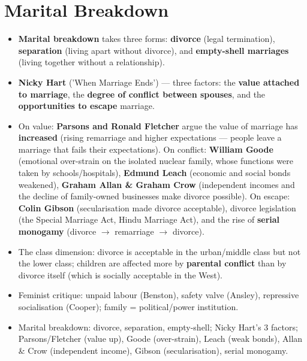 \section{Marital Breakdown}

\begin{KeyConcept}
\begin{itemize}
\item \textbf{Marital breakdown} takes three forms: \textbf{divorce} (legal termination), \textbf{separation} (living apart without divorce), and \textbf{empty-shell marriages} (living together without a relationship).
\item \textbf{Nicky Hart} ('When Marriage Ends') --- three factors: the \textbf{value attached to marriage}, the \textbf{degree of conflict between spouses}, and the \textbf{opportunities to escape} marriage.
\item On value: \textbf{Parsons and Ronald Fletcher} argue the value of marriage has \textbf{increased} (rising remarriage and higher expectations --- people leave a marriage that fails their expectations). On conflict: \textbf{William Goode} (emotional over-strain on the isolated nuclear family, whose functions were taken by schools/hospitals), \textbf{Edmund Leach} (economic and social bonds weakened), \textbf{Graham Allan \& Graham Crow} (independent incomes and the decline of family-owned businesses make divorce possible). On escape: \textbf{Colin Gibson} (secularisation made divorce acceptable), divorce legislation (the Special Marriage Act, Hindu Marriage Act), and the rise of \textbf{serial monogamy} (divorce $\rightarrow$ remarriage $\rightarrow$ divorce).
\item The class dimension: divorce is acceptable in the urban/middle class but not the lower class; children are affected more by \textbf{parental conflict} than by divorce itself (which is socially acceptable in the West).
\end{itemize}
\end{KeyConcept}

\begin{QuickRevision}
\begin{itemize}
\item Feminist critique: unpaid labour (Benston), safety valve (Ansley), repressive socialisation (Cooper); family = political/power institution.
\item Marital breakdown: divorce, separation, empty-shell; Nicky Hart's 3 factors; Parsons/Fletcher (value up), Goode (over-strain), Leach (weak bonds), Allan \& Crow (independent income), Gibson (secularisation), serial monogamy.
\end{itemize}
\end{QuickRevision}

